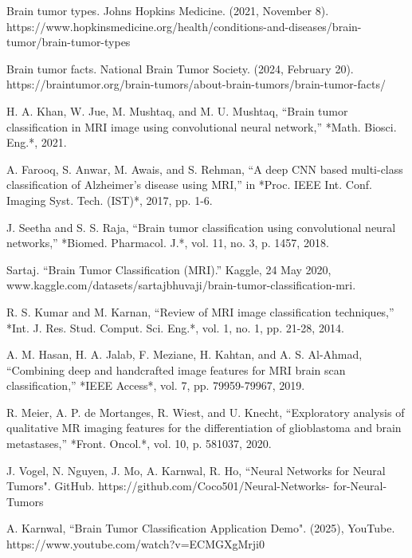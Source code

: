 \documentclass[conference]{IEEEtran}
\begin{document}
\begin{thebibliography}{00}

Brain tumor types. Johns Hopkins Medicine. (2021, November 8). https://www.hopkinsmedicine.org/health/conditions-and-diseases/brain-tumor/brain-tumor-types 

Brain tumor facts. National Brain Tumor Society. (2024, February 20). https://braintumor.org/brain-tumors/about-brain-tumors/brain-tumor-facts/ 

H. A. Khan, W. Jue, M. Mushtaq, and M. U. Mushtaq, “Brain tumor classification in MRI image using convolutional neural network,” *Math. Biosci. Eng.*, 2021. 

A. Farooq, S. Anwar, M. Awais, and S. Rehman, “A deep CNN based multi-class classification of Alzheimer's disease using MRI,” in *Proc. IEEE Int. Conf. Imaging Syst. Tech. (IST)*, 2017, pp. 1-6. 

J. Seetha and S. S. Raja, “Brain tumor classification using convolutional neural networks,” *Biomed. Pharmacol. J.*, vol. 11, no. 3, p. 1457, 2018.

Sartaj. “Brain Tumor Classification (MRI).” Kaggle, 24 May 2020, www.kaggle.com/datasets/sartajbhuvaji/brain-tumor-classification-mri. 

R. S. Kumar and M. Karnan, “Review of MRI image classification techniques,” *Int. J. Res. Stud. Comput. Sci. Eng.*, vol. 1, no. 1, pp. 21-28, 2014. 

A. M. Hasan, H. A. Jalab, F. Meziane, H. Kahtan, and A. S. Al-Ahmad, “Combining deep and handcrafted image features for MRI brain scan classification,” *IEEE Access*, vol. 7, pp. 79959-79967, 2019. 

R. Meier, A. P. de Mortanges, R. Wiest, and U. Knecht, “Exploratory analysis of qualitative MR imaging features for the differentiation of glioblastoma and brain metastases,” *Front. Oncol.*, vol. 10, p. 581037, 2020.

J. Vogel, N. Nguyen, J. Mo, A. Karnwal, R. Ho, ``Neural Networks for Neural Tumors". GitHub. https://github.com/Coco501/Neural-Networks-
for-Neural-Tumors

A. Karnwal, ``Brain Tumor Classification Application Demo". (2025), YouTube. https://www.youtube.com/watch?v=ECMGXgMrji0

\end{thebibliography}
\end{document}
